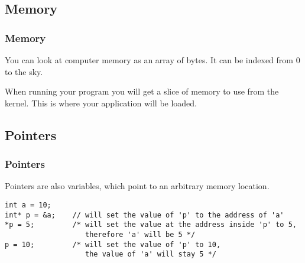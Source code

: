 \documentclass[
	11pt, %
]{beamer}
\begin{document}
\begin{frame}
    \subsection{Memory}
	\frametitle{Memory}

    You can look at computer memory as an array of bytes. It can be indexed from 0 to the sky.

    \bigskip

    When running your program you will get a slice of memory to use from the kernel.
    This is where your application will be loaded.

\end{frame}

\begin{frame}[fragile]
    \subsection{Pointers}
	\frametitle{Pointers}

    Pointers are also variables, which point to an arbitrary memory location.

    \bigskip

    \begin{lstlisting}[style=CStyle]
int a = 10;
int* p = &a;    // will set the value of 'p' to the address of 'a'
*p = 5;         /* will set the value at the address inside 'p' to 5,
                   therefore 'a' will be 5 */
p = 10;         /* will set the value of 'p' to 10,
                   the value of 'a' will stay 5 */

\end{lstlisting}
\end{frame}
\end{document}
